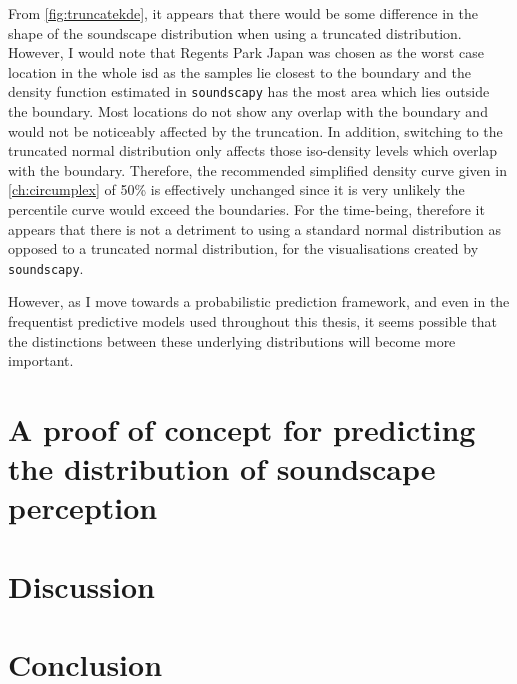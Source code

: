 From \cref{fig:truncatekde}, it appears that there would be some difference in the shape of the soundscape distribution when using a truncated distribution. However, I would note that Regents Park Japan was chosen as the worst case location in the whole \gls{isd} as the samples lie closest to the boundary and the density function estimated in \texttt{soundscapy} has the most area which lies outside the boundary. Most locations do not show any overlap with the boundary and would not be noticeably affected by the truncation. In addition, switching to the truncated normal distribution only affects those iso-density levels which overlap with the boundary. Therefore, the recommended simplified density curve given in \cref{ch:circumplex} of 50\% is effectively unchanged since it is very unlikely the  percentile curve would exceed the boundaries. For the time-being, therefore it appears that there is not a detriment to using a standard normal distribution as opposed to a truncated normal distribution, for the visualisations created by \texttt{soundscapy}.

However, as I move towards a probabilistic prediction framework, and even in the frequentist predictive models used throughout this thesis, it seems possible that the distinctions between these underlying distributions will become more important.

\section{A proof of concept for predicting the distribution of soundscape perception}

\section{Discussion}

\section{Conclusion}

